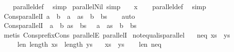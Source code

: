 \begin{isabellebody}
%
\isadelimproof
\ \ %
\endisadelimproof
%
\isatagproof
{}\isamarkupfalse%
\ parallel{\isacharunderscore}def\ \isamarkupfalse%
\ simp%
\endisatagproof
{\isafoldproof}%
%
\isadelimproof
\isanewline
%
\endisadelimproof
\isanewline
{}\isamarkupfalse%
\ parallel{\isacharunderscore}Nil{}\ {\isacharbrackleft}simp{\isacharbrackright}{\isacharcolon}\ {\isachardoublequoteopen}{\isasymnot}\ {\isacharbrackleft}{\isacharbrackright}\ {\isasymparallel}\ x{\isachardoublequoteclose}\isanewline
%
\isadelimproof
\ \ %
\endisadelimproof
%
\isatagproof
{}\isamarkupfalse%
\ parallel{\isacharunderscore}def\ \isamarkupfalse%
\ simp%
\endisatagproof
{\isafoldproof}%
%
\isadelimproof
\isanewline
%
\endisadelimproof
\isanewline
{}\isamarkupfalse%
\ Cons{\isacharunderscore}parallelI{}{\isacharcolon}\ {\isachardoublequoteopen}a\ {\isasymnoteq}\ b\ {\isasymLongrightarrow}\ a\ {\isacharhash}\ as\ {\isasymparallel}\ b\ {\isacharhash}\ bs{\isachardoublequoteclose}\isanewline
%
\isadelimproof
\ \ %
\endisadelimproof
%
\isatagproof
{}\isamarkupfalse%
\ auto%
\endisatagproof
{\isafoldproof}%
%
\isadelimproof
\isanewline
%
\endisadelimproof
\isanewline
{}\isamarkupfalse%
\ Cons{\isacharunderscore}parallelI{}{\isacharcolon}\ {\isachardoublequoteopen}{\isasymlbrakk}\ a\ {\isacharequal}\ b{\isacharsemicolon}\ as\ {\isasymparallel}\ bs\ {\isasymrbrakk}\ {\isasymLongrightarrow}\ a\ {\isacharhash}\ as\ {\isasymparallel}\ b\ {\isacharhash}\ bs{\isachardoublequoteclose}\isanewline
%
\isadelimproof
\ \ %
\endisadelimproof
%
\isatagproof
{}\isamarkupfalse%
\ {\isacharparenleft}metis\ Cons{\isacharunderscore}prefix{\isacharunderscore}Cons\ parallelE\ parallelI{\isacharparenright}%
\endisatagproof
{\isafoldproof}%
%
\isadelimproof
\isanewline
%
\endisadelimproof
\isanewline
{}\isamarkupfalse%
\ not{\isacharunderscore}equal{\isacharunderscore}is{\isacharunderscore}parallel{\isacharcolon}\isanewline
\ \ \ neq{\isacharcolon}\ {\isachardoublequoteopen}xs\ {\isasymnoteq}\ ys{\isachardoublequoteclose}\isanewline
\ \ \ \ \ len{\isacharcolon}\ {\isachardoublequoteopen}length\ xs\ {\isacharequal}\ length\ ys{\isachardoublequoteclose}\isanewline
\ \ \ {\isachardoublequoteopen}xs\ {\isasymparallel}\ ys{\isachardoublequoteclose}\isanewline
%
\isadelimproof
\ \ %
\endisadelimproof
%
\isatagproof
{}\isamarkupfalse%
\ len\ neq\isanewline
{}\isamarkupfalse%

\end{isabellebody}
